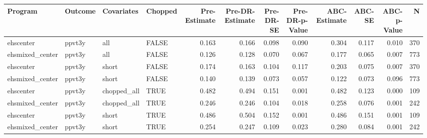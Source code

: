 \begin{table}[ht]
\centering
\begin{tabular}{llllrrrrrrrr}
  \hline
Program & Outcome & Covariates & Chopped & Pre-Estimate & Pre-DR-Estimate & Pre-DR-SE & Pre-DR-p-Value & ABC-Estimate & ABC-SE & ABC-p-Value & N \\ 
  \hline
ehscenter & ppvt3y & all & FALSE & 0.163 & 0.166 & 0.098 & 0.090 & 0.304 & 0.117 & 0.010 & 370 \\ 
  ehsmixed\_center & ppvt3y & all & FALSE & 0.126 & 0.128 & 0.070 & 0.067 & 0.177 & 0.065 & 0.007 & 773 \\ 
  ehscenter & ppvt3y & short & FALSE & 0.174 & 0.163 & 0.104 & 0.117 & 0.203 & 0.075 & 0.007 & 370 \\ 
  ehsmixed\_center & ppvt3y & short & FALSE & 0.140 & 0.139 & 0.073 & 0.057 & 0.122 & 0.073 & 0.096 & 773 \\ 
  ehscenter & ppvt3y & chopped\_all & TRUE & 0.482 & 0.494 & 0.151 & 0.001 & 0.482 & 0.123 & 0.000 & 109 \\ 
  ehsmixed\_center & ppvt3y & chopped\_all & TRUE & 0.246 & 0.246 & 0.104 & 0.018 & 0.258 & 0.076 & 0.001 & 242 \\ 
  ehscenter & ppvt3y & short & TRUE & 0.486 & 0.504 & 0.152 & 0.001 & 0.486 & 0.151 & 0.001 & 109 \\ 
  ehsmixed\_center & ppvt3y & short & TRUE & 0.254 & 0.247 & 0.109 & 0.023 & 0.280 & 0.084 & 0.001 & 242 \\ 
   \hline
\end{tabular}
\end{table}
